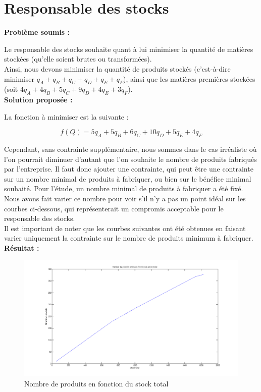 \documentclass[paper=a4, fontsize=11pt]{report}
\numberwithin{equation}{section}		%
\numberwithin{figure}{section}			%
\numberwithin{table}{section}				%
\renewcommand{\bf}[1]{\textbf{#1}}
\begin{document}
\section{Responsable des stocks}
\bf{Problème soumis :}

Le responsable des stocks souhaite quant à lui minimiser la quantité de matières stockées (qu'elle soient brutes ou transformées).\\

Ainsi, nous devons minimiser la quantité de produits stockés (c'est-à-dire minimiser $q_A + q_B + q_C + q_D + q_E + q_F$), ainsi que les matières premières stockées (soit $4q_A + 4q_B + 5q_C + 9q_D + 4q_E + 3q_F$).
\\

\bf{Solution proposée :}

La fonction à minimiser est la suivante : 

\[ f(Q) = 5q_A + 5q_B + 6q_C + 10q_D + 5q_E + 4q_F \]

Cependant, sans contrainte supplémentaire, nous sommes dans le cas irréaliste où l'on pourrait diminuer d'autant que l'on souhaite le nombre de produits fabriqués par l'entreprise. Il faut donc ajouter une contrainte, qui peut être une contrainte sur un nombre minimal de produits à fabriquer, ou bien sur le bénéfice minimal souhaité.
Pour l'étude, un nombre minimal de produits à fabriquer a été fixé. Nous avons fait varier ce nombre pour voir s'il n'y a pas un point idéal sur les courbes ci-dessous, qui représenterait un compromis acceptable pour le responsable des stocks.\\

Il est important de noter que les courbes suivantes ont été obtenues en faisant varier uniquement la contrainte sur le nombre de produits minimum à fabriquer.\\

\newpage
\bf{Résultat :}

\begin{figure}[H]
\centering
\includegraphics[width=16cm]{figures/nbProduitsFctStockTotal.png}
\caption{Nombre de produits en fonction du stock total \label{figstock}}
\end{figure}
\end{document}
